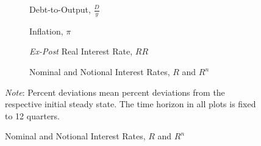 \documentclass[12pt]{article} %
\numberwithin{equation}{section} %
\numberwithin{figure}{section}
\numberwithin{table}{section}
\begin{document}
\begin{refsection}
\begin{appendices}
\begin{figure}[H]
    \caption{Supplement for Figure \ref{fig:baseline-permanent-wedge-agg}}%
    \label{fig:baseline-permanent-wedge-agg-extra}
    \begin{subfigure}[b]{0.49\textwidth}
     \caption{Debt-to-Output, $\frac{D}{y}$}
     \label{fig:baseline-permanent-wedge-agg-DY}
         \centering
         
     \end{subfigure}
     \hfill
     \begin{subfigure}[b]{0.49\textwidth}
     \centering
     \caption{Inflation, $\pi$}
     \label{fig:baseline-permanent-wedge-agg-pi}
         
     \end{subfigure}
     \hfill
    \begin{subfigure}[b]{0.49\textwidth}
     \caption{\textit{Ex-Post} Real Interest Rate, $RR$}
     \label{fig:baseline-permanent-wedge-agg-Rr}
         \centering
         
     \end{subfigure}
     \hfill
     \begin{subfigure}[b]{0.49\textwidth}
     \caption{Nominal and Notional Interest Rates, $R$ and $R^n$}
     \label{fig:baseline-permanent-wedge-agg-Rn}
         \centering
         
     \end{subfigure}

     \vspace{10pt}

     \begin{flushleft}
     \footnotesize
	\textit{Note}: Percent deviations mean percent deviations from the respective initial steady state. The time horizon in all plots is fixed to 12 quarters.
	\end{flushleft}
\end{figure}



\end{appendices}
\end{refsection}
\end{document}
